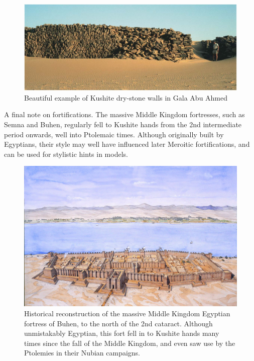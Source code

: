 \documentclass[a4paper,12pt]{scrreprt}
\begin{document}
\begin{figure}[H]
	\centering
	\includegraphics[width=\textwidth]{img/fortress/dry_stone_wall_gala_abu_ahmed}
	\caption{Beautiful example of Kushite dry-stone walls in Gala Abu Ahmed}
\end{figure}

A final note on fortifications. The massive Middle Kingdom fortresses, such as Semna and Buhen, regularly fell to Kushite hands from the 2nd intermediate period onwards, well into Ptolemaic times. Although originally built by Egyptians, their style may well have influenced later Meroitic fortifications, and can be used for stylistic hints in models.

\begin{figure}[H]
	\centering
	\includegraphics[width=\textwidth]{img/fortress/reconstruction_fortress_of_buhen}
	\caption{Historical reconstruction of the massive Middle Kingdom Egyptian fortress of Buhen, to the north of the 2nd cataract. Although unmistakably Egyptian, this fort fell in to Kushite hands many times since the fall of the Middle Kingdom, and even saw use by the Ptolemies in their Nubian campaigns.}
\end{figure}
\end{document}
